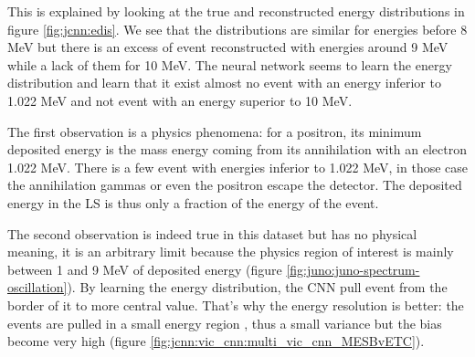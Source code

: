 \documentclass[../main.tex]{subfiles}
\begin{document}
This is explained by looking at the true and reconstructed energy distributions in figure \ref{fig:jcnn:edis}. We see that the distributions are similar for energies before 8 MeV but there is an excess of event reconstructed with energies around 9 MeV while a lack of them for 10 MeV. The neural network seems to learn the energy distribution and learn that it exist almost no event with an energy inferior to 1.022 MeV and not event with an energy superior to 10 MeV.

The first observation is a physics phenomena: for a positron, its minimum deposited energy is the mass energy coming from its annihilation with an electron 1.022 MeV. There is a few event with energies inferior to 1.022 MeV, in those case the annihilation gammas or even the positron escape the detector. The deposited energy in the LS is thus only a fraction of the energy of the event.

The second observation is indeed true in this dataset but has no physical meaning, it is an arbitrary limit because the physics region of interest is mainly between 1 and 9 MeV of deposited energy (figure \ref{fig:juno:juno-spectrum-oscillation}). By learning the energy distribution, the CNN pull event from the border of it to more central value. That's why the energy resolution is better: the events are pulled in a small energy region , thus a small variance but the bias become very high (figure \ref{fig:jcnn:vic_cnn:multi_vic_cnn_MESBvETC}).
\end{document}
